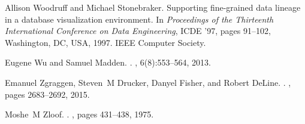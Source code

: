 \documentclass[11pt]{article}
\begin{document}
{\begin{thebibliography}{}
Allison Woodruff and Michael Stonebraker.
\newblock Supporting fine-grained data lineage in a database visualization
  environment.
\newblock In {\em Proceedings of the Thirteenth International Conference on
  Data Engineering}, ICDE '97, pages 91--102, Washington, DC, USA, 1997. IEEE
  Computer Society.

Eugene Wu and Samuel Madden.
.
, 6(8):553--564, 2013.

Emanuel Zgraggen, Steven~M Drucker, Danyel Fisher, and Robert DeLine.
.
, pages 2683--2692, 2015.

Moshe~M Zloof.
.
, pages 431--438, 1975.

\end{thebibliography}
}
\end{document}
